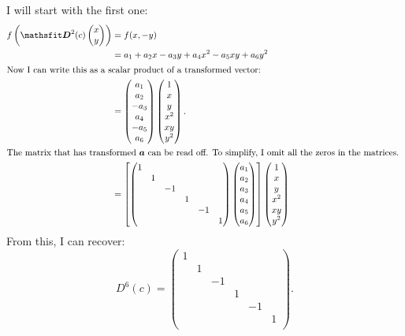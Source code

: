 \documentclass[11pt, english, fleqn, DIV=15, headinclude, BCOR=1cm]{scrartcl}
\begin{document}
I will start with the first one:
\begin{align*}
    f\del{\tens D^2(c) \begin{pmatrix}
        x \\ y
    \end{pmatrix}}
    &= f(x, -y) \\
    &= a_1 + a_2 x - a_3 y + a_4 x^2 - a_5 xy + a_6 y^2 \\
    \intertext{%
        Now I can write this as a scalar product of a transformed vector:
    }
    &=
    \begin{pmatrix}
        a_1 \\ a_2 \\ - a_3 \\ a_4 \\ - a_5 \\ a_6
    \end{pmatrix}
    \begin{pmatrix}
        1 \\ x \\ y \\ x^2 \\ xy \\ y^2
    \end{pmatrix}. \\
    \intertext{%
        The matrix that has transformed $\vec a$ can be read off. To simplify,
        I omit all the zeros in the matrices.
    }
    &=
    \sbr{
        \begin{pmatrix}
            1 & & & & & \\
            & 1 & & & & \\
            & & -1 & & & \\
            & & & 1 & & \\
            & & & & -1 & \\
            & & & & & 1 \\
        \end{pmatrix}
        \begin{pmatrix}
            a_1 \\ a_2 \\ a_3 \\ a_4 \\ a_5 \\ a_6
        \end{pmatrix}
    }
    \begin{pmatrix}
        1 \\ x \\ y \\ x^2 \\ xy \\ y^2
    \end{pmatrix}
\end{align*}
From this, I can recover:
\[
    D^6(c) =
    \begin{pmatrix}
        1 & & & & & \\
          & 1 & & & & \\
          & & -1 & & & \\
          & & & 1 & & \\
          & & & & -1 & \\
          & & & & & 1 \\
    \end{pmatrix}.
\]
\end{document}
